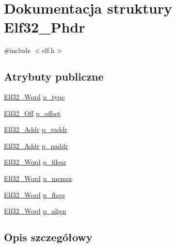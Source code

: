 \hypertarget{struct_elf32___phdr}{\section{Dokumentacja struktury Elf32\-\_\-\-Phdr}
\label{struct_elf32___phdr}
}


{\ttfamily \#include $<$elf.\-h$>$}

\subsection*{Atrybuty publiczne}
\begin{DoxyCompactItemize}
\item 
\hyperlink{elf_8h_af5924ece606c732e86f8263a19408e45}{Elf32\-\_\-\-Word} \hyperlink{struct_elf32___phdr_a8b1d2942ddb9abcb85db1429b5116923}{p\-\_\-type}
\item 
\hyperlink{elf_8h_a655751f9b317369b93c581ea8ed84516}{Elf32\-\_\-\-Off} \hyperlink{struct_elf32___phdr_ac590d4c4b26104216e53058b5b03eef0}{p\-\_\-offset}
\item 
\hyperlink{elf_8h_a40c6d4571e6001f443cc6a6474620158}{Elf32\-\_\-\-Addr} \hyperlink{struct_elf32___phdr_a01a298ebc899bcf9c23211a7bf1155a6}{p\-\_\-vaddr}
\item 
\hyperlink{elf_8h_a40c6d4571e6001f443cc6a6474620158}{Elf32\-\_\-\-Addr} \hyperlink{struct_elf32___phdr_af18f0a179a5fca09e3c04bcdce3fac2f}{p\-\_\-paddr}
\item 
\hyperlink{elf_8h_af5924ece606c732e86f8263a19408e45}{Elf32\-\_\-\-Word} \hyperlink{struct_elf32___phdr_ac9151f2e11001284bf1c7d2d2659555c}{p\-\_\-filesz}
\item 
\hyperlink{elf_8h_af5924ece606c732e86f8263a19408e45}{Elf32\-\_\-\-Word} \hyperlink{struct_elf32___phdr_ada1cdd3d6ccb79a17bed0e3c21379c84}{p\-\_\-memsz}
\item 
\hyperlink{elf_8h_af5924ece606c732e86f8263a19408e45}{Elf32\-\_\-\-Word} \hyperlink{struct_elf32___phdr_a35c457e6828894b7b275730593802050}{p\-\_\-flags}
\item 
\hyperlink{elf_8h_af5924ece606c732e86f8263a19408e45}{Elf32\-\_\-\-Word} \hyperlink{struct_elf32___phdr_afd09d9e4297b13fc94fd57d09f2a9f70}{p\-\_\-align}
\end{DoxyCompactItemize}


\subsection{Opis szczegółowy}


